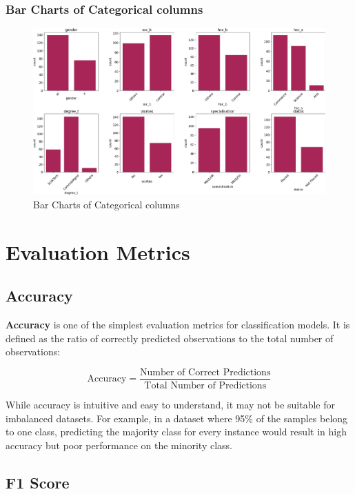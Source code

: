\documentclass{article}%
\begin{document}
%
\newpage%
\subsubsection{Bar Charts of Categorical columns}%
\label{ssubsec:BarChartsofCategoricalcolumns}%


\begin{figure}[h!]%
\centering%
\includegraphics[width=460px]{EDA/bar_charts.png}%
\caption{Bar Charts of Categorical columns}%
\end{figure}

%
\newpage%
\section{Evaluation Metrics}%
\label{sec:EvaluationMetrics}%
\subsection{Accuracy}%
\label{subsec:Accuracy}%

                \textbf{Accuracy} is one of the simplest evaluation metrics for classification models. 
                It is defined as the ratio of correctly predicted observations to the total number of observations:

                \[
                \text{Accuracy} = \frac{\text{Number of Correct Predictions}}{\text{Total Number of Predictions}}
                \]

                While accuracy is intuitive and easy to understand, it may not be suitable for imbalanced datasets. 
                For example, in a dataset where 95\% of the samples belong to one class, predicting the majority class for every instance 
                would result in high accuracy but poor performance on the minority class.
                

%
\subsection{F1 Score}%
\label{subsec:F1Score}%
\end{document}
